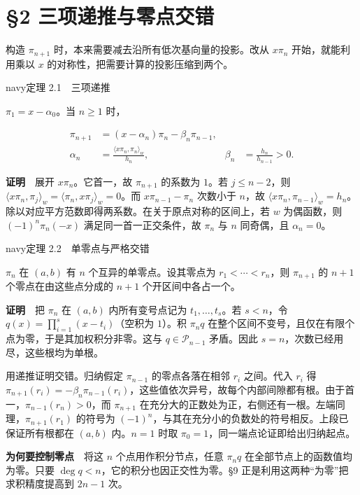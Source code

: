 \documentclass[11pt,a4paper]{article}
\newcommand{\lectureheading}[1]{\section{#1}}
\begin{document}
\clearpage\lectureheading{§2 三项递推与零点交错}

构造 \(\pi_{n+1}\) 时，本来需要减去沿所有低次基向量的投影。改从 \(x\pi_n\) 开始，就能利用乘以 \(x\) 的对称性，把需要计算的投影压缩到两个。

\begin{sboxenv}{navy}{定理 2.1　三项递推}

\(\pi_1=x-\alpha_0\)。当 \(n\ge1\) 时，

\[
\begin{aligned}
\pi_{n+1}&=(x-\alpha_n)\pi_n-\beta_n\pi_{n-1},\\
\alpha_n&=\frac{\langle x\pi_n,\pi_n\rangle_w}{h_n},
&\beta_n&=\frac{h_n}{h_{n-1}}>0 .
\end{aligned}
\]

\end{sboxenv}

\textbf{证明}　展开 \(x\pi_n\)。它首一，故 \(\pi_{n+1}\) 的系数为 \(1\)。若 \(j\le n-2\)，则 \(\langle x\pi_n,\pi_j\rangle_w=\langle\pi_n,x\pi_j\rangle_w=0\)。而 \(x\pi_{n-1}-\pi_n\) 次数小于 \(n\)，故 \(\langle x\pi_n,\pi_{n-1}\rangle_w=h_n\)。除以对应平方范数即得两系数。在关于原点对称的区间上，若 \(w\) 为偶函数，则 \((-1)^n\pi_n(-x)\) 满足同一首一正交条件，故 \(\pi_n\) 与 \(n\) 同奇偶，且 \(\alpha_n=0\)。

\begin{sboxenv}{navy}{定理 2.2　单零点与严格交错}

\(\pi_n\) 在 \((a,b)\) 有 \(n\) 个互异的单零点。设其零点为 \(r_1<\cdots<r_n\)，则 \(\pi_{n+1}\) 的 \(n+1\) 个零点在由这些点分成的 \(n+1\) 个开区间中各占一个。

\end{sboxenv}

\textbf{证明}　把 \(\pi_n\) 在 \((a,b)\) 内所有变号点记为 \(t_1,\ldots,t_s\)。若 \(s<n\)，令 \(q(x)=\prod_{i=1}^{s}(x-t_i)\)（空积为 \(1\)）。积 \(\pi_n q\) 在整个区间不变号，且仅在有限个点为零，于是其加权积分非零。这与 \(q\in\mathcal P_{n-1}\) 矛盾。因此 \(s=n\)，次数已经用尽，这些根均为单根。

用递推证明交错。归纳假定 \(\pi_{n-1}\) 的零点各落在相邻 \(r_i\) 之间。代入 \(r_i\) 得 \(\pi_{n+1}(r_i)=-\beta_n\pi_{n-1}(r_i)\)，这些值依次异号，故每个内部间隙都有根。由于首一，\(\pi_{n-1}(r_n)>0\)，而 \(\pi_{n+1}\) 在充分大的正数处为正，右侧还有一根。左端同理，\(\pi_{n+1}(r_1)\) 的符号为 \((-1)^n\)，与其在充分小的负数处的符号相反。上段已保证所有根都在 \((a,b)\) 内。\(n=1\) 时取 \(\pi_0=1\)，同一端点论证即给出归纳起点。

\textbf{为何要控制零点}　将这 \(n\) 个点用作积分节点，任意 \(\pi_n q\) 在全部节点上的函数值均为零。只要 \(\deg q<n\)，它的积分也因正交性为零。§9 正是利用这两种``为零''把求积精度提高到 \(2n-1\) 次。
\end{document}
